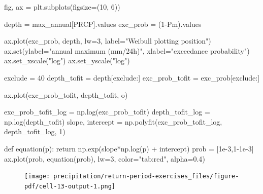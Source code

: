 \documentclass[
  letterpaper,
  DIV=11,
  numbers=noendperiod]{scrreprt}
\newenvironment{Shaded}{\begin{snugshade}}{\end{snugshade}}
\newcommand{\BuiltInTok}[1]{\textcolor[rgb]{0.00,0.23,0.31}{#1}}
\newcommand{\ControlFlowTok}[1]{\textcolor[rgb]{0.00,0.23,0.31}{#1}}
\newcommand{\DecValTok}[1]{\textcolor[rgb]{0.68,0.00,0.00}{#1}}
\newcommand{\FloatTok}[1]{\textcolor[rgb]{0.68,0.00,0.00}{#1}}
\newcommand{\KeywordTok}[1]{\textcolor[rgb]{0.00,0.23,0.31}{#1}}
\newcommand{\NormalTok}[1]{\textcolor[rgb]{0.00,0.23,0.31}{#1}}
\newcommand{\OperatorTok}[1]{\textcolor[rgb]{0.37,0.37,0.37}{#1}}
\newcommand{\StringTok}[1]{\textcolor[rgb]{0.13,0.47,0.30}{#1}}
\begin{document}
\begin{Shaded}
\begin{Highlighting}[]
\NormalTok{fig, ax }\OperatorTok{=}\NormalTok{ plt.subplots(figsize}\OperatorTok{=}\NormalTok{(}\DecValTok{10}\NormalTok{, }\DecValTok{6}\NormalTok{))}

\NormalTok{depth }\OperatorTok{=}\NormalTok{ max\_annual[}\StringTok{\textquotesingle{}PRCP\textquotesingle{}}\NormalTok{].values}
\NormalTok{exc\_prob }\OperatorTok{=}\NormalTok{ (}\DecValTok{1}\OperatorTok{{-}}\NormalTok{Pm).values}

\NormalTok{ax.plot(exc\_prob, depth, lw}\OperatorTok{=}\DecValTok{3}\NormalTok{, label}\OperatorTok{=}\StringTok{"Weibull plotting position"}\NormalTok{)}
\NormalTok{ax.}\BuiltInTok{set}\NormalTok{(ylabel}\OperatorTok{=}\StringTok{"annual maximum (mm/24h)"}\NormalTok{,}
\NormalTok{       xlabel}\OperatorTok{=}\StringTok{"exceedance probability"}\NormalTok{)}
\NormalTok{ax.set\_xscale(}\StringTok{"log"}\NormalTok{)}
\NormalTok{ax.set\_yscale(}\StringTok{"log"}\NormalTok{)}

\NormalTok{exclude }\OperatorTok{=} \DecValTok{40}
\NormalTok{depth\_tofit }\OperatorTok{=}\NormalTok{ depth[exclude:]}
\NormalTok{exc\_prob\_tofit }\OperatorTok{=}\NormalTok{ exc\_prob[exclude:]}

\NormalTok{ax.plot(exc\_prob\_tofit, depth\_tofit, }\StringTok{\textquotesingle{}o\textquotesingle{}}\NormalTok{)}

\NormalTok{exc\_prob\_tofit\_log }\OperatorTok{=}\NormalTok{ np.log(exc\_prob\_tofit)}
\NormalTok{depth\_tofit\_log }\OperatorTok{=}\NormalTok{ np.log(depth\_tofit)}
\NormalTok{slope, intercept }\OperatorTok{=}\NormalTok{ np.polyfit(exc\_prob\_tofit\_log, depth\_tofit\_log, }\DecValTok{1}\NormalTok{)}

\KeywordTok{def}\NormalTok{ equation(p):}
    \ControlFlowTok{return}\NormalTok{ np.exp(slope}\OperatorTok{*}\NormalTok{np.log(p) }\OperatorTok{+}\NormalTok{ intercept)}
\NormalTok{prob }\OperatorTok{=}\NormalTok{ [}\FloatTok{1e{-}3}\NormalTok{,}\DecValTok{1}\OperatorTok{{-}}\FloatTok{1e{-}3}\NormalTok{]}
\NormalTok{ax.plot(prob, equation(prob), lw}\OperatorTok{=}\DecValTok{3}\NormalTok{, color}\OperatorTok{=}\StringTok{"tab:red"}\NormalTok{, alpha}\OperatorTok{=}\FloatTok{0.4}\NormalTok{)}
\end{Highlighting}
\end{Shaded}

\begin{figure}[H]

{\centering \texttt{[image: precipitation/return-period-exercises\_files/figure-pdf/cell-13-output-1.png]}

}

\end{figure}
\end{document}
